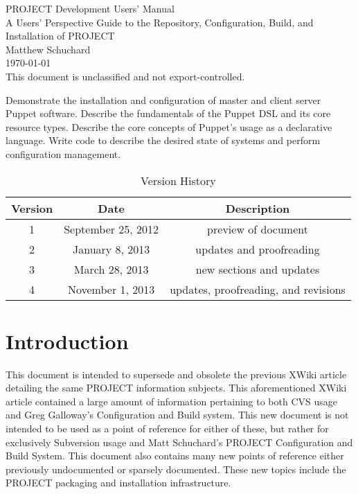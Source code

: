 \documentclass[12pt,letterpaper]{article}
\begin{document}
\begin{titlepage}
\mbox{}
\begin{center}

\Huge PROJECT Development Users' Manual\\
\vspace{1cm}
\Large A Users' Perspective Guide to the Repository, Configuration, Build, and Installation of PROJECT\\
\vspace{3in}
\large Matthew Schuchard\\
\vspace{1in}
\today\\
\vspace{1cm}
This document is unclassified and not export-controlled.

\end{center}
\end{titlepage}
Demonstrate the installation and configuration of master and client server Puppet software.
Describe the fundamentals of the Puppet DSL and its core resource types.
Describe the core concepts of Puppet’s usage as a declarative language.
Write code to describe the desired state of systems and perform configuration management.
\begin{table}[h]
\centering
\caption{Version History}
\begin{tabular}{| c | c | c |}
Version & Date & Description\\
\hline
1 & September 25, 2012 & preview of document\\
2 & January 8, 2013 & updates and proofreading\\
3 & March 28, 2013 & new sections and updates\\
4 & November 1, 2013 & updates, proofreading, and revisions\\
\end{tabular}
\end{table}
\clearpage

\tableofcontents

\section{Introduction}

This document is intended to supersede and obsolete the previous XWiki article detailing the same PROJECT information subjects.  This aforementioned XWiki article contained a large amount of information pertaining to both CVS usage and Greg Galloway's Configuration and Build system.  This new document is not intended to be used as a point of reference for either of these, but rather for exclusively Subversion usage and Matt Schuchard's PROJECT Configuration and Build System.  This document also contains many new points of reference either previously undocumented or sparsely documented.  These new topics include the PROJECT packaging and installation infrastructure.
\end{document}
